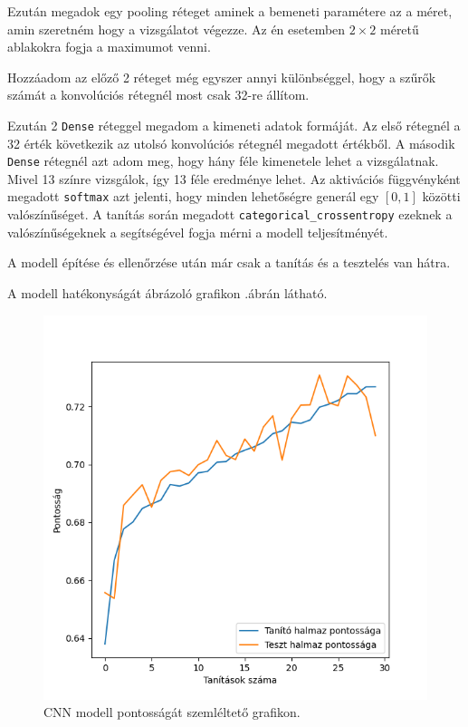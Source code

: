 Ezután megadok egy pooling réteget aminek a bemeneti paramétere az a méret, amin szeretném hogy a vizsgálatot végezze. Az én esetemben $2 \times 2$ méretű ablakokra fogja a maximumot venni.

Hozzáadom az előző 2 réteget még egyszer annyi különbséggel, hogy a szűrők számát a konvolúciós rétegnél most csak 32-re állítom.

Ezután 2 \texttt{Dense} réteggel megadom a kimeneti adatok formáját. Az első rétegnél a 32 érték következik az utolsó konvolúciós rétegnél megadott értékből. A második \texttt{Dense} rétegnél azt adom meg, hogy hány féle kimenetele lehet a vizsgálatnak. Mivel 13 színre vizsgálok, így 13 féle eredménye lehet. Az aktivációs függvényként megadott \texttt{softmax} azt jelenti, hogy minden lehetőségre generál egy $[0, 1]$ közötti valószínűséget. A tanítás során megadott \texttt{categorical\_crossentropy} ezeknek a valószínűségeknek a segítségével fogja mérni a modell teljesítményét.

A modell építése és ellenőrzése után már csak a tanítás és a tesztelés van hátra.


A modell hatékonyságát ábrázoló grafikon .ábrán látható.

\begin{figure}[h]
\centering
\includegraphics[scale=0.7]{images/cnn_accuracy.png}
\caption{CNN modell pontosságát szemléltető grafikon.}
\label{fig:cnn_accuracy}
\end{figure}

